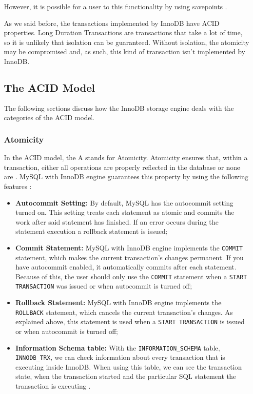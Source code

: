 \documentclass[12pt]{article}
\begin{document}
However, it is possible for a user to  this functionality by using savepoints \parencite{nestedMySQL}.

\vspace{0.3cm}

As we said before, the transactions implemented by InnoDB have ACID properties. Long Duration Transactions are transactions that take a lot of time, so it is unlikely that isolation can be guaranteed. Without isolation, the atomicity may be compromised and, as such, this kind of transaction isn't implemented by InnoDB.


\subsection{The ACID Model}
The following sections discuss how the InnoDB storage engine deals with the categories of the ACID model.

\subsubsection{Atomicity}
\label{atomicity} 
In the ACID model, the A stands for Atomicity. Atomicity ensures that, within a transaction, either all operations are properly reflected in the database or none are \parencite{AulaTransactions}. MySQL with InnoDB engine guarantees this property by using the following features \parencite{innodbACID}:

\begin{itemize}
    \item \textbf{Autocommit Setting:} By default, MySQL has the autocommit setting turned on. This setting treats each statement as atomic and commits the work after said statement has finished. If an error occurs during the statement execution a rollback statement is issued;
    
    \item \textbf{Commit Statement:} MySQL with InnoDB engine implements the \verb|COMMIT| statement, which makes the current transaction's changes permanent. If you have autocommit enabled, it automatically commits after each statement. Because of this, the user should only use the \verb|COMMIT| statement when a \verb|START TRANSACTION| was issued or when autocommit is turned off;
    
    \item \textbf{Rollback Statement:} MySQL with InnoDB engine implements the \verb|ROLLBACK| statement, which cancels the current transaction's changes. As explained above, this statement is used when a \verb|START TRANSACTION| is issued or when autocommit is turned off;

    \item \textbf{Information Schema table:} With the \verb|INFORMATION_SCHEMA| table, \verb|INNODB_TRX|, we can check information about every transaction that is executing inside InnoDB. When using this table, we can see the transaction state, when the transaction started and the particular SQL statement the transaction is executing \parencite{InformationSchemaTransactionLockingInfo}.
    
\end{itemize}
\end{document}
